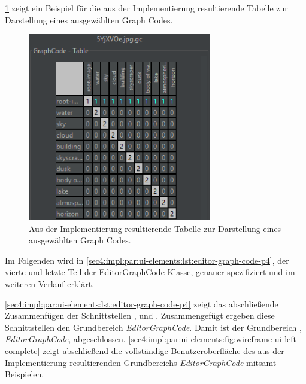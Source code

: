 \cref{sec4:impl:par:ui-elements:fig:wireframe-ui-6} zeigt ein Beispiel für die aus der Implementierung resultierende Tabelle zur Darstellung eines ausgewählten Graph Codes.

\begin{figure}[!ht]
  \includegraphics[width=8cm, keepaspectratio]{chapter/chapter_4/wireframe-impl-ui-6}
  \caption{Aus der Implementierung resultierende Tabelle zur Darstellung eines ausgewählten Graph Codes.}
  \label{sec4:impl:par:ui-elements:fig:wireframe-ui-6}
\end{figure}

Im Folgenden wird in \cref{sec4:impl:par:ui-elements:lst:editor-graph-code-p4}, der vierte und letzte Teil der EditorGraphCode-Klasse, genauer spezifiziert und im weiteren Verlauf erklärt.



\cref{sec4:impl:par:ui-elements:lst:editor-graph-code-p4} zeigt das abschließende Zusammenfügen der Schnittstellen ,  und .
Zusammengefügt ergeben diese Schnittstellen den Grundbereich \textit{EditorGraphCode}.
Damit ist der Grundbereich , \textit{EditorGraphCode}, abgeschlossen.
\cref{sec4:impl:par:ui-elements:fig:wireframe-ui-left-complete} zeigt abschließend die vollständige Benutzeroberfläche des aus der Implementierung resultierenden Grundbereichs \textit{EditorGraphCode} mitsamt Beispielen.

